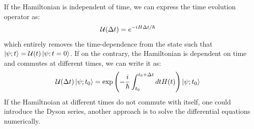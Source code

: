 If the Hamiltonian is independent of time, we can express the time evolution operator as:
\begin{equation}
    \mathcal{U}(\Delta t) = e^{-iH\Delta t/\hbar}
\end{equation}
which entirely removes the time-dependence from the state such that $\ket{\psi; t} = \mathcal{U}(t)\ket{\psi; t = 0}$.
If on the contrary, the Hamiltonian is dependent on time and commutes at different times, we can write it as:
\begin{equation}
    \mathcal{U}(\Delta t)\ket{\psi; t_0} = \exp\left(-\frac{i}{\hbar}\int_{t_0}^{t_0 + \Delta t} dt H(t)\right)\ket{\psi; t_0}
\end{equation}
If the Hamiltnoian at different times do not commute with itself, one could introduce the Dyson series\cite{sakurai_modern_2021}, another approach is to solve the differential equations numerically.

